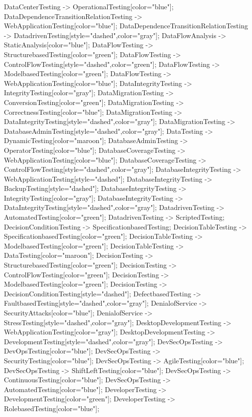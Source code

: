 \documentclass{article}
\begin{document}
{DataCenterTesting -> OperationalTesting[color="blue"];
DataDependenceTransitionRelationTesting -> WebApplicationTesting[color="blue"];
DataDependenceTransitionRelationTesting -> DatadrivenTesting[style="dashed",color="gray"];
DataFlowAnalysis -> StaticAnalysis[color="blue"];
DataFlowTesting -> StructurebasedTesting[color="green"];
DataFlowTesting -> ControlFlowTesting[style="dashed",color="green"];
DataFlowTesting -> ModelbasedTesting[color="green"];
DataFlowTesting -> WebApplicationTesting[color="blue"];
DataIntegrityTesting -> IntegrityTesting[color="gray"];
DataMigrationTesting -> ConversionTesting[color="green"];
DataMigrationTesting -> CorrectnessTesting[color="blue"];
DataMigrationTesting -> DataIntegrityTesting[style="dashed",color="gray"];
DataMigrationTesting -> DatabaseAdminTesting[style="dashed",color="gray"];
DataTesting -> DynamicTesting[color="maroon"];
DatabaseAdminTesting -> OperatorTesting[color="blue"];
DatabaseCoverageTesting -> WebApplicationTesting[color="blue"];
DatabaseCoverageTesting -> ControlFlowTesting[style="dashed",color="gray"];
DatabaseIntegrityTesting -> WebApplicationTesting[style="dashed"];
DatabaseIntegrityTesting -> BackupTesting[style="dashed"];
DatabaseIntegrityTesting -> IntegrityTesting[color="gray"];
DatabaseIntegrityTesting -> DataIntegrityTesting[style="dashed",color="gray"];
DatadrivenTesting -> AutomatedTesting[color="green"];
DatadrivenTesting -> ScriptedTesting;
DecisionConditionTesting -> SpecificationbasedTesting;
DecisionTableTesting -> SpecificationbasedTesting[color="green"];
DecisionTableTesting -> ModelbasedTesting[color="green"];
DecisionTableTesting -> DataTesting[color="maroon"];
DecisionTesting -> StructurebasedTesting[color="green"];
DecisionTesting -> ControlFlowTesting[color="green"];
DecisionTesting -> ModelbasedTesting[color="green"];
DecisionTesting -> DecisionConditionTesting[style="dashed"];
DefectbasedTesting -> FaultbasedTesting[style="dashed",color="gray"];
DenialofService -> SecurityAttacks[color="blue"];
DenialofService -> StressTesting[style="dashed",color="gray"];
DesktopDevelopmentTesting -> WebApplicationTesting[color="gray"];
DesktopDevelopmentTesting -> DevelopmentTesting[style="dashed",color="gray"];
DevSecOpsTesting -> DevOpsTesting[color="blue"];
DevSecOpsTesting -> SecurityTesting[color="blue"];
DevSecOpsTesting -> AgileTesting[color="blue"];
DevSecOpsTesting -> ShiftLeftTesting[color="blue"];
DevSecOpsTesting -> ContinuousTesting[color="blue"];
DevSecOpsTesting -> AutomatedTesting[color="blue"];
DeveloperTesting -> DevelopmentTesting[color="green"];
DeveloperTesting -> RolebasedTesting[color="blue"];
}
\end{document}
